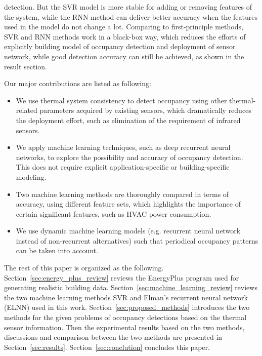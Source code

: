 detection. \textcolor{feb18rev}{But the SVR model is more stable for
  adding or removing features of the system, while the RNN method can
  deliver better accuracy when the features used in the model do not
  change a lot. Comparing to first-principle methods, SVR and
  RNN methods work in a black-box way, which reduces the efforts of
  explicitly building model of occupancy detection and deployment of sensor
  network, while good detection accuracy can still be achieved, as shown in the
  result section.} \textcolor{feb18rev}{Our major contributions are listed as
  following:
\begin{itemize}
\item We use thermal system consistency to detect occupancy using other
    thermal-related parameters acquired by existing sensors, which dramatically
    reduces the deployment effort, such as elimination of the requirement
    of infrared sensors.
\item We apply machine learning techniques, such as deep recurrent neural
    networks, to explore the possibility and accuracy of occupancy detection.
    This does not require explicit application-specific or building-specific
    modeling.
\item Two machine learning methods are thoroughly compared in terms of accuracy,
    using different feature sets, which highlights the importance of certain
    significant features, such as HVAC power consumption.
\item We use dynamic machine learning models (e.g. recurrent neural network
    instead of non-recurrent alternatives) such that periodical occupancy
    patterns can be taken into account.
\end{itemize}
}

The rest of this paper is organized as the following.
Section~\ref{sec:energy_plus_review} reviews the EnergyPlus program used for
generating realistic building data. Section~\ref{sec:machine_learning_review}
reviews the two machine learning methods SVR and Elman's recurrent neural
network (ELNN) used in this work. Section~\ref{sec:proposed_methods} introduces
the two methods for the given problems of occupancy detections based on the
thermal sensor information. Then the experimental results based on the two
methods, discussions and comparison between the two methods are presented in
Section~\ref{sec:results}. Section~\ref{sec:conclution} concludes this paper.
